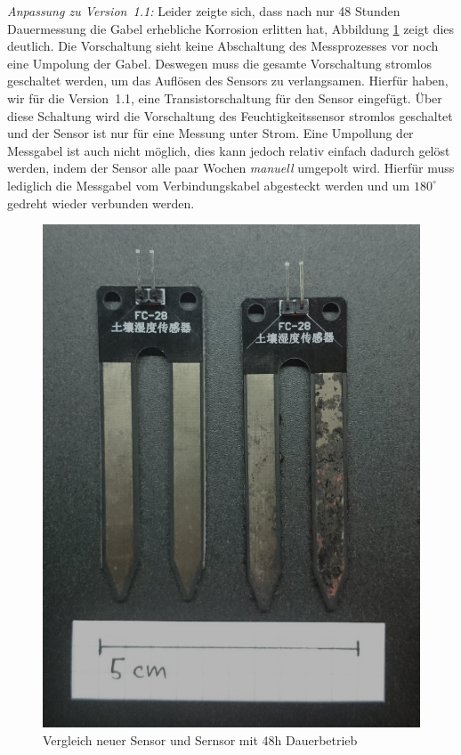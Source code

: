 \emph{Anpassung zu Version~1.1:}
Leider zeigte sich, dass nach nur 48 Stunden Dauermessung die Gabel erhebliche Korrosion erlitten hat, Abbildung \ref{fig-SensorVergleich} zeigt dies deutlich.
Die Vorschaltung sieht keine Abschaltung des Messprozesses vor noch eine Umpolung der Gabel. 
Deswegen muss die gesamte Vorschaltung stromlos geschaltet werden, um das Auflösen des Sensors zu verlangsamen. 
Hierfür haben, wir für die Version~1.1, eine Transistorschaltung für den Sensor eingefügt. 
Über diese Schaltung wird die Vorschaltung des Feuchtigkeitssensor stromlos geschaltet und der Sensor ist nur für eine Messung unter Strom. 
Eine Umpollung der Messgabel ist auch nicht möglich, dies kann jedoch relativ einfach dadurch gelöst werden, indem der Sensor alle paar Wochen \emph{manuell} umgepolt wird. 
Hierfür muss lediglich die Messgabel vom Verbindungskabel abgesteckt werden und um \begin{math}180^{\circ}\end{math} gedreht wieder verbunden werden.

\begin{figure}[!h]
	\centering
	\includegraphics[width=0.8\linewidth]{bilder/_fechtesensorVergleich0.jpg}
	\caption{Vergleich neuer Sensor und Sernsor mit 48h Dauerbetrieb}
	\label{fig-SensorVergleich}
\end{figure}

